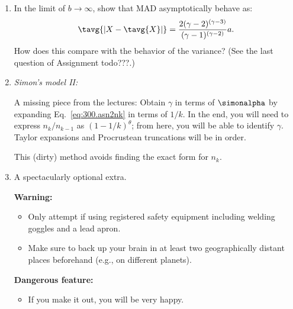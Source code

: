 \begin{enumerate}
   \solutionend

\item

  In the limit of $b \rightarrow \infty$,
  show that MAD asymptotically behave as:
  $$
  \tavg{|X - \tavg{X}|}
  =
  \frac{2(\gamma-2)^{(\gamma-3)}}
       {(\gamma-1)^{(\gamma-2)}
       }
       a.
       $$
       How does this compare with the behavior of the variance?
       (See the last question of Assignment todo{???}.)

       
   \solutionstart


   \solutionend


     \item 

       \textit{Simon's model II:}

       A missing piece from the lectures: Obtain $\gamma$ in terms of $\simonalpha$ 
       by expanding Eq.~\ref{eq:300.asn2nk} in terms of $1/k$.  In the end,
       you will need to express $n_{k}/n_{k-1}$ as $(1-1/k)^\theta$; from
       here, you will be able to identify $\gamma$.
       Taylor expansions and Procrustean truncations will be in order.

       This (dirty) method avoids finding the exact form for $n_{k}$.

       
   \solutionstart


   \solutionend

       
     \item 
       A spectacularly optional extra.
       
       \textbf{Warning:}
       \begin{itemize}
       \item 
         Only attempt if using registered safety equipment
         including welding goggles and a lead apron.
       \item 
         Make sure to back up your brain in at least two
         geographically distant places beforehand (e.g., 
         on different planets).
       \end{itemize}

       \textbf{Dangerous feature:}
       \begin{itemize}
       \item 
         If you make it out, you will be very happy.
       \end{itemize}



\end{enumerate}
